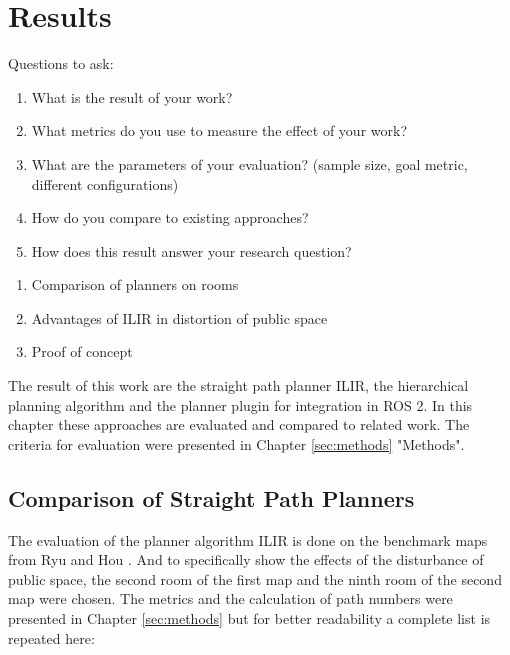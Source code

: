 \chapter{Results}
\label{sec:results}
Questions to ask:
\begin{enumerate}
    \item What is the result of your work?
    \item What metrics do you use to measure the effect of your work?
    \item What are the parameters of your evaluation? (sample size, goal metric, different configurations)
    \item How do you compare to existing approaches?
    \item How does this result answer your research question?
\end{enumerate}

\begin{enumerate}
    \item Comparison of planners on rooms
    \item Advantages of ILIR in distortion of public space
    \item Proof of concept 
\end{enumerate}

The result of this work are the straight path planner ILIR, the hierarchical planning algorithm and the planner plugin for integration in ROS 2. In this chapter these approaches are evaluated and compared to related work. The criteria for evaluation were presented in Chapter \ref{sec:methods} "Methods".

\section{Comparison of Straight Path Planners}
\label{sec:evaluation_straight_path}
The evaluation of the planner algorithm ILIR is done on the benchmark maps from Ryu \cite{ryu_hierarchical_2020} and Hou \cite{hou_straight_2021}. And to specifically show the effects of the disturbance of public space, the second room of the first map and the ninth room of the second map were chosen. The metrics and the calculation of path numbers were presented in Chapter \ref{sec:methods} but for better readability a complete list is repeated here:

